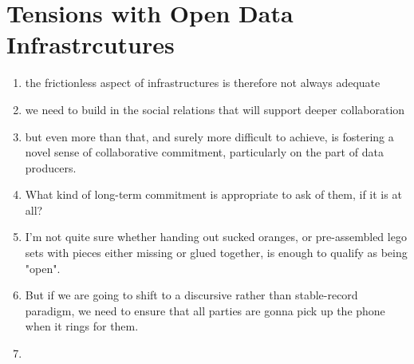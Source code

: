 \documentclass[12pt]{article}
\begin{document}
\section{Tensions with Open Data Infrastrcutures}
\begin{enumerate}
  \item the frictionless aspect of infrastructures is therefore not always adequate
  \item we need to build in the social relations that will support deeper collaboration
  \item but even more than that, and surely more difficult to achieve, is fostering a novel sense of collaborative commitment, particularly on the part of data producers.
  \item What kind of long-term commitment is appropriate to ask of them, if it is at all?
  \item I'm not quite sure whether handing out sucked oranges, or pre-assembled lego sets with pieces either missing or glued together, is enough to qualify as being "open".
  \item But if we are going to shift to a discursive rather than stable-record paradigm, we need to ensure that all parties are gonna pick up the phone when it rings for them.
  \item 



\end{enumerate}
\end{document}
